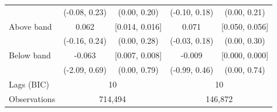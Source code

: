 \begin{tabular}{lcccc}
 & (-0.08, 0.23) & (0.00, 0.20) & (-0.10, 0.18) & (0.00, 0.21) \\
Above band & 0.062 & [0.014, 0.016] & 0.071 & [0.050, 0.056] \\
 & (-0.16, 0.24) & (0.00, 0.28) & (-0.03, 0.18) & (0.00, 0.30) \\
Below band & -0.063 & [0.007, 0.008] & -0.009 & [0.000, 0.000] \\
 & (-2.09, 0.69) & (0.00, 0.79) & (-0.99, 0.46) & (0.00, 0.74) \\
\midrule
Lags (BIC) & \multicolumn{2}{c}{10} & \multicolumn{2}{c}{10} \\
Observations & \multicolumn{2}{c}{714,494} & \multicolumn{2}{c}{146,872} \\
\bottomrule
\end{tabular}
